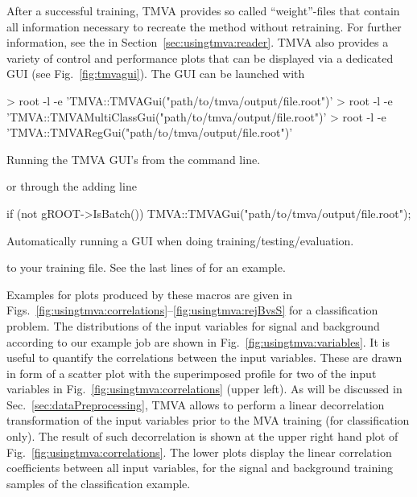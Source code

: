 After a successful training, TMVA provides so called ``weight''-files that contain all information necessary to recreate the method without retraining. For further information, see the  in Section~\ref{sec:usingtmva:reader}. TMVA also provides a variety of control and performance plots that can be displayed via a dedicated GUI (see Fig.~\ref{fig:tmvagui}). The GUI can be launched with
\begin{codeexample}\begin{tmvacode}
> root -l -e 'TMVA::TMVAGui("path/to/tmva/output/file.root")'
> root -l -e 'TMVA::TMVAMultiClassGui("path/to/tmva/output/file.root")'
> root -l -e 'TMVA::TMVARegGui("path/to/tmva/output/file.root")'
\end{tmvacode}
\caption[.]{\codeexampleCaptionSize Running the TMVA GUI's from the command line.}
\end{codeexample}
or through the adding line
\begin{codeexample}\begin{tmvacode}
if (not gROOT->IsBatch()) {
   TMVA::TMVAGui("path/to/tmva/output/file.root");
}
\end{tmvacode}
\caption[.]{\codeexampleCaptionSize Automatically running a GUI when doing training/testing/evaluation.}
\end{codeexample}
to your training file. See the last lines of  for an example.


Examples for plots produced by these macros are given in
Figs.~\ref{fig:usingtmva:correlations}--\ref{fig:usingtmva:rejBvsS} for a
classification problem.
The distributions of the input variables for signal and background
according to our example job are shown in Fig.~\ref{fig:usingtmva:variables}.
It is useful to quantify the correlations between the input variables.
These are drawn in form of a scatter plot with the superimposed profile for
two of the input variables in Fig.~\ref{fig:usingtmva:correlations} (upper left).
As will be discussed in Sec.~\ref{sec:dataPreprocessing}, TMVA allows to perform
a linear decorrelation transformation of the input variables prior to the MVA
training (for classification only). The result of such decorrelation is shown
at the upper right hand plot of Fig.~\ref{fig:usingtmva:correlations}. The lower
plots display the linear correlation coefficients between all input variables,
for the signal and background training samples of the classification example.

